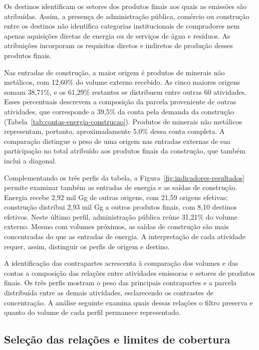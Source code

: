 Os destinos identificam os setores dos produtos finais aos quais as emissões são atribuídas. Assim, a presença de administração pública, comércio ou construção entre os destinos não identifica categorias institucionais de compradores nem apenas aquisições diretas de energia ou de serviços de água e resíduos. As atribuições incorporam os requisitos diretos e indiretos de produção desses produtos finais.

Nas entradas de construção, a maior origem é produtos de minerais não metálicos, com 12,60\% do volume externo recebido. As cinco maiores origens somam 38,71\%, e os 61,29\% restantes se distribuem entre outras 60 atividades. Esses percentuais descrevem a composição da parcela proveniente de outras atividades, que corresponde a 39,5\% da conta pela demanda da construção (Tabela~\ref{tab:contas-energia-construcao}). Produtos de minerais não metálicos representam, portanto, aproximadamente 5,0\% dessa conta completa. A comparação distingue o peso de uma origem nas entradas externas de sua participação no total atribuído aos produtos finais da construção, que também inclui a diagonal.



Complementando os três perfis da tabela, a Figura~\ref{fig:indicadores-resultados} permite examinar também as entradas de energia e as saídas de construção. Energia recebe 2,92 mil Gg de outras origens, com 21,59 origens efetivas; construção distribui 2,93 mil Gg a outros produtos finais, com 8,10 destinos efetivos. Neste último perfil, administração pública reúne 31,21\% do volume externo. Mesmo com volumes próximos, as saídas de construção são mais concentradas do que as entradas de energia. A interpretação de cada atividade requer, assim, distinguir os perfis de origem e destino.

A identificação das contrapartes acrescenta à comparação dos volumes e das contas a composição das relações entre atividades emissoras e setores de produtos finais. Os três perfis mostram o peso das principais contrapartes e a parcela distribuída entre as demais atividades, esclarecendo os contrastes de concentração. A análise seguinte examina quais dessas relações o filtro preserva e quanto do volume de cada perfil permanece representado.

\clearpage
\subsection{Seleção das relações e limites de cobertura}


